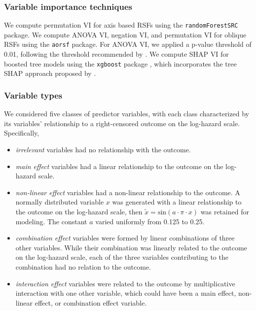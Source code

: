 \documentclass{article}\usepackage[]{graphicx}\usepackage[]{xcolor}
\begin{document}
\subsubsection{Variable importance techniques}

We compute permutation VI for axis based RSFs using the \texttt{randomForestSRC} package. We compute ANOVA VI, negation VI, and permutation VI for oblique RSFs using the \texttt{aorsf} package. For ANOVA VI, we applied a p-value threshold of 0.01, following the threshold recommended by \citet{menze2011oblique}. We compute SHAP VI for boosted tree models using the \texttt{xgboost} package \citep{xgboost}, which incorporates the tree SHAP approach proposed by \citet{lundberg2018consistent}.


\subsubsection{Variable types}

We considered five classes of predictor variables, with each class characterized by its variables' relationship to a right-censored outcome on the log-hazard scale. Specifically, \begin{itemize}
\item \textit{irrelevant} variables had no relationship with the outcome.
\item \textit{main effect} variables had a linear relationship to the outcome on the log-hazard scale.
\item \textit{non-linear effect} variables had a non-linear relationship to the outcome. A normally distributed variable $x$ was generated with a linear relationship to the outcome on the log-hazard scale, then $\tilde{x} = \text{sin}(a \cdot \pi \cdot x)$ was retained for modeling. The constant $a$ varied uniformly from 0.125 to 0.25.
\item \textit{combination effect} variables were formed by linear combinations of three other variables. While their combination was linearly related to the outcome on the log-hazard scale, each of the three variables contributing to the combination had no relation to the outcome.
\item \textit{interaction effect} variables were related to the outcome by multiplicative interaction with one other variable, which could have been a main effect, non-linear effect, or combination effect variable.
\end{itemize}
\end{document}
